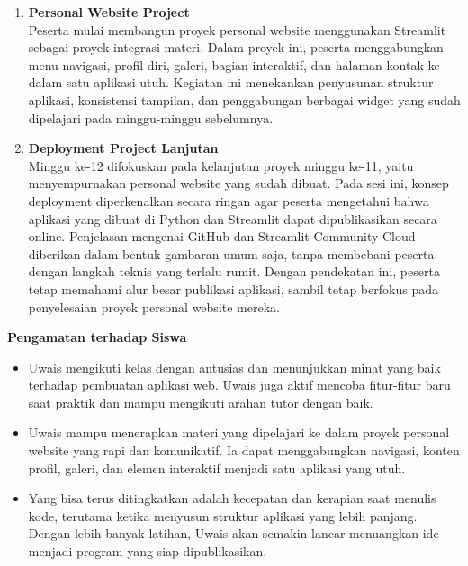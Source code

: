 \documentclass[11pt,a4paper]{article}
\begin{document}
\begin{enumerate}[leftmargin=1.6em, label=\arabic*.]
\item \textbf{Personal Website Project}\\
Peserta mulai membangun proyek personal website menggunakan Streamlit sebagai proyek integrasi materi. Dalam proyek ini, peserta menggabungkan menu navigasi, profil diri, galeri, bagian interaktif, dan halaman kontak ke dalam satu aplikasi utuh. Kegiatan ini menekankan penyusunan struktur aplikasi, konsistensi tampilan, dan penggabungan berbagai widget yang sudah dipelajari pada minggu-minggu sebelumnya.

\item \textbf{Deployment Project Lanjutan}\\
Minggu ke-12 difokuskan pada kelanjutan proyek minggu ke-11, yaitu menyempurnakan personal website yang sudah dibuat. Pada sesi ini, konsep deployment diperkenalkan secara ringan agar peserta mengetahui bahwa aplikasi yang dibuat di Python dan Streamlit dapat dipublikasikan secara online. Penjelasan mengenai GitHub dan Streamlit Community Cloud diberikan dalam bentuk gambaran umum saja, tanpa membebani peserta dengan langkah teknis yang terlalu rumit. Dengan pendekatan ini, peserta tetap memahami alur besar publikasi aplikasi, sambil tetap berfokus pada penyelesaian proyek personal website mereka.
\end{enumerate}

\textbf{Pengamatan terhadap Siswa}
\begin{itemize}
\item [--] Uwais mengikuti kelas dengan antusias dan menunjukkan minat yang baik terhadap pembuatan aplikasi web. Uwais juga aktif mencoba fitur-fitur baru saat praktik dan mampu mengikuti arahan tutor dengan baik.
\item [--] Uwais mampu menerapkan materi yang dipelajari ke dalam proyek personal website yang rapi dan komunikatif. Ia dapat menggabungkan navigasi, konten profil, galeri, dan elemen interaktif menjadi satu aplikasi yang utuh.
\item [--] Yang bisa terus ditingkatkan adalah kecepatan dan kerapian saat menulis kode, terutama ketika menyusun struktur aplikasi yang lebih panjang. Dengan lebih banyak latihan, Uwais akan semakin lancar menuangkan ide menjadi program yang siap dipublikasikan.
\end{itemize}
\end{document}
